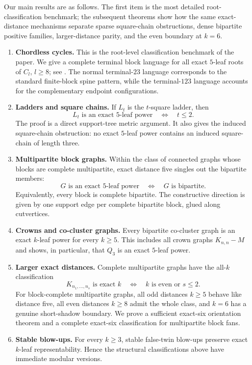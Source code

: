 \documentclass[11pt]{article}
\theoremstyle{definition}
\begin{document}
Our main results are as follows.  The first item is the most detailed root-classification benchmark; the subsequent theorems show how the same exact-distance mechanisms separate sparse square-chain obstructions, dense bipartite positive families, larger-distance parity, and the even boundary at $k=6$.
\begin{enumerate}[label=\textup{(\roman*)},leftmargin=2.2em]
\item \textbf{Chordless cycles.}  This is the root-level classification benchmark of the paper.  We give a complete terminal block language for all exact $5$-leaf roots of $C_l$, $l\ge8$; see .  The normal terminal-$23$ language corresponds to the standard finite-block spine pattern, while the terminal-$123$ language accounts for the complementary endpoint configurations.

\item \textbf{Ladders and square chains.}  If $L_t$ is the $t$-square ladder, then
\[
 L_t \text{ is an exact }5\text{-leaf power}\quad\Longleftrightarrow\quad t\le2.
\]
The proof is a direct support-tree metric argument.  It also gives the induced square-chain obstruction: no exact $5$-leaf power contains an induced square-chain of length three.

\item \textbf{Multipartite block graphs.}  Within the class of connected graphs whose blocks are complete multipartite, exact distance five singles out the bipartite members:
\[
 G\text{ is an exact }5\text{-leaf power}\quad\Longleftrightarrow\quad G\text{ is bipartite}.
\]
Equivalently, every block is complete bipartite.  The constructive direction is given by one support edge per complete bipartite block, glued along cutvertices.

\item \textbf{Crowns and co-cluster graphs.}  Every bipartite co-cluster graph is an exact $k$-leaf power for every $k\ge5$.  This includes all crown graphs $K_{n,n}-M$ and shows, in particular, that $Q_3$ is an exact $5$-leaf power.

\item \textbf{Larger exact distances.}  Complete multipartite graphs have the all-$k$ classification
\[
 K_{n_1,\ldots,n_s}\text{ is exact }k
 \quad\Longleftrightarrow\quad
 k\text{ is even or }s\le2.
\]
For block-complete multipartite graphs, all odd distances $k\ge5$ behave like distance five, all even distances $k\ge8$ admit the whole class, and $k=6$ has a genuine short-shadow boundary.  We prove a sufficient exact-six orientation theorem and a complete exact-six classification for multipartite block fans.

\item \textbf{Stable blow-ups.}  For every $k\ge3$, stable false-twin blow-ups preserve exact $k$-leaf representability.  Hence the structural classifications above have immediate modular versions.
\end{enumerate}
\end{document}

